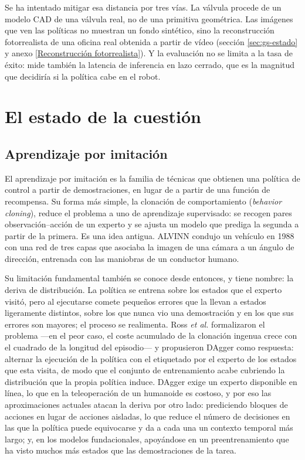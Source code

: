 Se ha intentado mitigar esa distancia por tres vías. La válvula procede de un modelo CAD de una
válvula real, no de una primitiva geométrica. Las imágenes que ven las políticas no muestran un
fondo sintético, sino la reconstrucción fotorrealista de una oficina real obtenida a partir de vídeo
(sección \ref{sec:gs-estado} y anexo \ref{Reconstrucción fotorrealista}). Y la evaluación no se
limita a la tasa de éxito: mide también la latencia de inferencia en lazo cerrado, que es la
magnitud que decidiría si la política cabe en el robot.


\section{El estado de la cuestión}

\subsection{Aprendizaje por imitación}

El aprendizaje por imitación es la familia de técnicas que obtienen una política de control a
partir de demostraciones, en lugar de a partir de una función de recompensa. Su forma más simple, la
clonación de comportamiento (\textit{behavior cloning}), reduce el problema a uno de aprendizaje
supervisado: se recogen pares observación--acción de un experto y se ajusta un modelo que prediga la
segunda a partir de la primera. Es una idea antigua. ALVINN \cite{pomerleau1988alvinn} condujo un
vehículo en 1988 con una red de tres capas que asociaba la imagen de una cámara a un ángulo de
dirección, entrenada con las maniobras de un conductor humano.

Su limitación fundamental también se conoce desde entonces, y tiene nombre: la deriva de
distribución. La política se entrena sobre los estados que el experto visitó, pero al ejecutarse
comete pequeños errores que la llevan a estados ligeramente distintos, sobre los que nunca vio una
demostración y en los que sus errores son mayores; el proceso se realimenta. Ross \textit{et al.}
\cite{ross2011dagger} formalizaron el problema —en el peor caso, el coste acumulado de la clonación
ingenua crece con el cuadrado de la longitud del episodio— y propusieron DAgger como respuesta:
alternar la ejecución de la política con el etiquetado por el experto de los estados que esta
visita, de modo que el conjunto de entrenamiento acabe cubriendo la distribución que la propia
política induce. DAgger exige un experto disponible en línea, lo que en la teleoperación de un
humanoide es costoso, y por eso las aproximaciones actuales atacan la deriva por otro lado:
prediciendo bloques de acciones en lugar de acciones aisladas, lo que reduce el número de decisiones
en las que la política puede equivocarse y da a cada una un contexto temporal más largo; y, en los
modelos fundacionales, apoyándose en un preentrenamiento que ha visto muchos más estados que las
demostraciones de la tarea.

